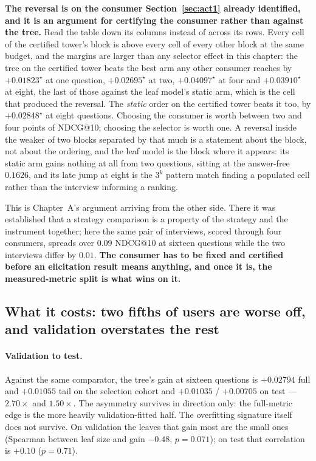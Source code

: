 \documentclass[11pt]{article}
\begin{document}
\textbf{The reversal is on the consumer Section~\ref{sec:act1} already identified, and it is an
argument for certifying the consumer rather than against the tree.} Read the table down its columns
instead of across its rows. Every cell of the certified tower's block is above every cell of every
other block at the same budget, and the margins are larger than any selector effect in this chapter:
the tree on the certified tower beats the best arm any other consumer reaches by $+0.01823^\star$ at
one question, $+0.02695^\star$ at two, $+0.04097^\star$ at four and $+0.03910^\star$ at eight, the
last of those against the leaf model's static arm, which is the cell that produced the reversal. The
\emph{static} order on the certified tower beats it too, by $+0.02848^\star$ at eight questions.
Choosing the consumer is worth between two and four points of NDCG@10; choosing the selector is worth
one. A reversal inside the weaker of two blocks separated by that much is a statement about the block,
not about the ordering, and the leaf model is the block where it appears: its static arm gains nothing
at all from two questions, sitting at the answer-free $0.1626$, and its late jump at eight is the
$3^k$ pattern match finding a populated cell rather than the interview informing a ranking.

This is Chapter~A's argument arriving from the other side. There it was established that a strategy
comparison is a property of the strategy and the instrument together; here the same pair of interviews,
scored through four consumers, spreads over $0.09$ NDCG@10 at sixteen questions while the two
interviews differ by $0.01$. \textbf{The consumer has to be fixed and certified before an elicitation
result means anything, and once it is, the measured-metric split is what wins on it.}

\subsection{What it costs: two fifths of users are worse off, and validation overstates the rest}

\paragraph{Validation to test.} Against the same comparator, the tree's gain at sixteen questions is
$+0.02794$ full and $+0.01055$ tail on the selection cohort and $+0.01035$ / $+0.00705$ on test ---
$2.70\times$ and $1.50\times$. The asymmetry survives in direction only: the full-metric edge is the
more heavily validation-fitted half. The overfitting signature itself does not survive. On validation
the leaves that gain most are the small ones (Spearman between leaf size and gain $-0.48$,
$p{=}0.071$); on test that correlation is $+0.10$ ($p{=}0.71$).
\end{document}

